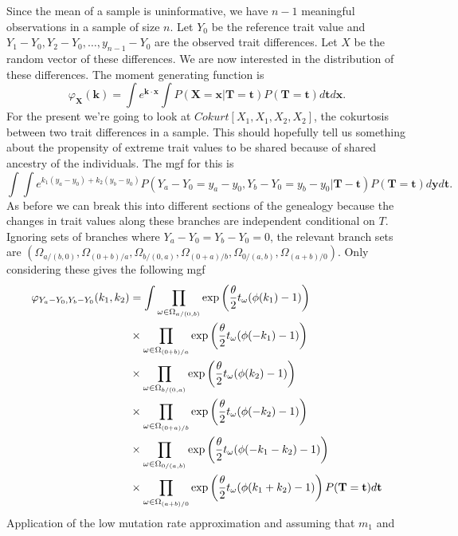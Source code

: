 Since the mean of a sample is uninformative, we have $n-1$ meaningful
observations in a sample of size $n$. Let $Y_0$ be the reference trait value and
$Y_1-Y_0,Y_2-Y_0,\ldots,y_{n-1}-Y_0$ are the observed trait differences. Let $X$
be the random vector of these differences. We are now interested in the
distribution of these differences. The moment generating function is
\begin{equation}
  \varphi_{\mathbf{X}}(\mathbf{k}) =
  \int e^{\mathbf{k} \cdot \mathbf{x} }
  \int P(\mathbf{X}=\mathbf{x}|\mathbf{T} = \mathbf{t})
  P(\mathbf{T}=\mathbf{t})d\mathbf{t}d\mathbf{x}.
\end{equation}
For the present we're going to look at $Cokurt[X_1,X_1,X_2,X_2]$, the cokurtosis between
two trait differences in a sample. This should hopefully tell us something about
the propensity of extreme trait values to be shared because of shared ancestry
of the individuals. The mgf for this is
\begin{equation}
  \int \int e^{k_1(y_a-y_0) + k_2(y_b-y_0)} P(Y_a-Y_0=y_a-y_0,Y_b-Y_0=y_b-y_0|\mathbf{T}-\mathbf{t})
  P(\mathbf{T}=\mathbf{t})d\mathbf{y}d\mathbf{t}.
\end{equation}
As before we can break this into different sections of the genealogy because the
changes in trait values along these branches are independent conditional on $T$.
Ignoring sets of branches where $Y_a-Y_0=Y_b-Y_0=0$, the relevant branch sets
are $(\Omega_{a/(b,0)},\Omega_{(0+b)/a},\Omega_{b/(0,a)},\Omega_{(0+a)/b},\Omega_{0/(a,b)},\Omega_{(a+b)/0})$.
Only considering these gives the following mgf
\begin{align*}
  \varphi_{Y_a-Y_0,Y_b-Y_0}(k_1,k_2) &=
  \int \prod_{\omega \in \Omega_{a/(0,b)}}\exp\left( \frac{\theta}{2} t_{\omega} (\phi(k_1)-1) \right) \\
  &\times \prod_{\omega \in \Omega_{(0+b)/a}}\exp\left( \frac{\theta}{2} t_{\omega} (\phi(-k_1)-1) \right) \\
  &\times \prod_{\omega \in \Omega_{b/(0,a)}}\exp\left( \frac{\theta}{2} t_{\omega} (\phi(k_2)-1) \right) \\
  &\times \prod_{\omega \in \Omega_{(0+a)/b}}\exp\left( \frac{\theta}{2} t_{\omega} (\phi(-k_2)-1) \right) \\
  &\times \prod_{\omega \in \Omega_{0/(a,b)}}\exp\left( \frac{\theta}{2} t_{\omega} (\phi(-k_1-k_2)-1) \right) \\
  &\times \prod_{\omega \in \Omega_{(a+b)/0}}\exp\left( \frac{\theta}{2} t_{\omega} (\phi(k_1+k_2)-1) \right)
  P(\mathbf{T}=\mathbf{t})d\mathbf{t}
\end{align*}
Application of the low mutation rate approximation and assuming that $m_1$ and
